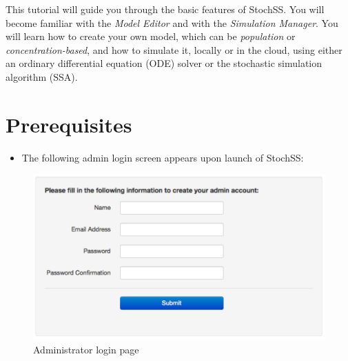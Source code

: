 This tutorial will guide you through the basic features of StochSS. You will become familiar with the \textit{Model Editor} and with the \textit{Simulation Manager}. You will learn how to create your own model, which can be \textit{population} or \textit{concentration-based}, and how to simulate it, locally or in the cloud, using either an ordinary differential equation (ODE) solver or the stochastic simulation algorithm (SSA).

\section{\label{sec:pre}Prerequisites}
\begin{itemize}
\item The following admin login screen appears upon launch of StochSS:
\end{itemize}

\begin{figure}[!htb]
\centering
\includegraphics[scale=0.64]{T1/admin-login.pdf}
\caption{Administrator login page}
\end{figure}


